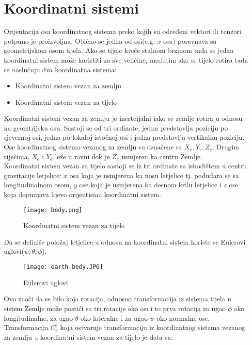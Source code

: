 \section{Koordinatni sistemi}
Orijentacija osa koordinatnog sistema preko kojih su određeni 
vektori ili tenzori potpuno je proizvoljna. Obično se jedna od osi(e.g. $x$ osa) poravnava 
sa geometrijskom osom tijela. 
Ako se tijelo kreće stalnom brzinom tada se jedan koordinatni sistem može 
koristiti za sve veličine, međutim ako se tijelo rotira tada se naslućuju dva koordinatna sistema:
\begin{itemize}
    \item Koordinatni sistem vezan za zemlju
    \item Koordinatni sistem vezan za tijelo
\end{itemize}
Koordinatni sistem vezan za zemlju je inertcijalni iako se zemlje rotira u odnosu na geomtrijsku osu.
Sastoji se od tri ordinate, jedna predstavlja poziciju po sjevernoj osi, jedna po lokaloj istočnoj osi 
i jedna predstavlja vertikalnu poziciju. Ose koordinatnog sistema vezanog za zemlju su 
označene sa $X_e, Y_e, Z_e$. Drugim riječima, $X_e$ i $Y_e$ leže u ravni dok je $Z_e$ usmjeren ka centru Zemlje.\\
Koordinatni sistem vezan za tijelo sastoji se iz tri ordinate sa ishodištem u centru gravitacije letjelice: $x$ osa koja je
usmjerena ka nosu letjelice tj. podudara se sa longitudinalnom osom, $y$ ose koja je usmjerena ka desnom krilu letjelice i $z$ ose koja dopunjava lijevo orijentisani 
koordinatni sistem.
\begin{figure}[h!]
    \centering
    \texttt{[image: body.png]}
    \caption{Koordinatni sistem vezan za tijelo}
    \label{fig:KBS}
\end{figure}
Da se definiše položaj letjelice u odnosu na koordinatni sistem koriste se Eulerovi uglovi($\psi, \theta, \phi$).
\begin{figure}[h!]
    \centering
    \texttt{[image: earth-body.JPG]}
    \caption{Eulerovi uglovi}
\end{figure}
Ovo znači da se bilo koja rotacija, odnosno transformacija iz sistema tijela u sistem Zemlje može postići sa tri rotacije oko osi i to prva 
rotacija za ugao $\phi$ oko longitudinalne, za ugao $\theta$ oko lateralne i za ugao 
$\psi$ oko normalne ose. Transformacija $C_e^b$ koja ostvaruje transformaciju iz 
koordinatnog sistema vezanog za zemlju u koordinatni sistem vezan za tijelo je data sa:
